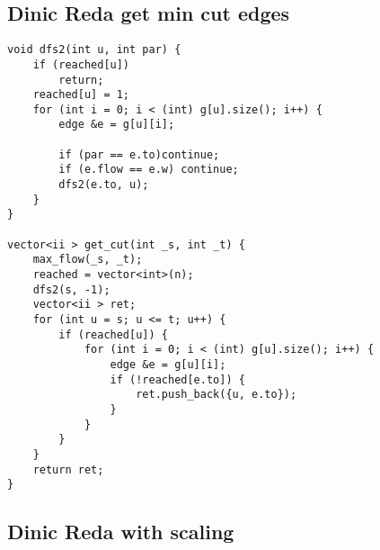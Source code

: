 \subsection{Dinic Reda get min cut edges}

\begin{lstlisting}[style=cpp]
void dfs2(int u, int par) {  
    if (reached[u])  
        return;  
    reached[u] = 1;  
    for (int i = 0; i < (int) g[u].size(); i++) {  
        edge &e = g[u][i];  
  
        if (par == e.to)continue;  
        if (e.flow == e.w) continue;  
        dfs2(e.to, u);  
    }  
}  
  
vector<ii > get_cut(int _s, int _t) {  
    max_flow(_s, _t);
    reached = vector<int>(n);  
    dfs2(s, -1);  
    vector<ii > ret;  
    for (int u = s; u <= t; u++) {  
        if (reached[u]) {  
            for (int i = 0; i < (int) g[u].size(); i++) {  
                edge &e = g[u][i];  
                if (!reached[e.to]) {  
                    ret.push_back({u, e.to});  
                }  
            }  
        }  
    }  
    return ret;  
}
\end{lstlisting}

\subsection{Dinic Reda with scaling}

